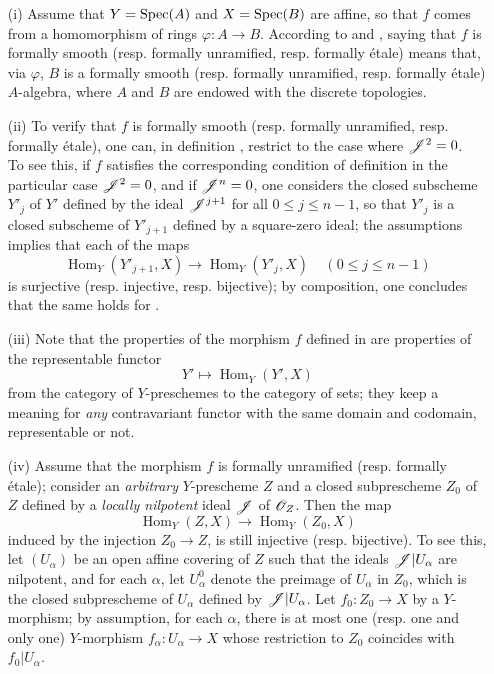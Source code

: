 \begin{remark}[17.1.2]
\label{IV.17.1.2}
\begin{enumerate}
	\item[(i)] Assume that $Y = {\mathop{\mathrm{Spec}}\nolimits}(A)$ and $X = {\mathop{\mathrm{Spec}}\nolimits}(B)$ are affine, so that $f$ comes from a homomorphism of rings $\varphi: A \to B$. 
    According to  and , saying that $f$ is formally smooth (resp. formally unramified, resp. formally \'etale) means that, via $\varphi$, $B$ is a formally smooth (resp. formally unramified, resp. formally \'etale) $A$-algebra, where $A$ and $B$ are endowed with the discrete topologies.
	\item[(ii)] To verify that $f$ is formally smooth (resp. formally unramified, resp. formally \'etale), one can, in definition , restrict to the case where $\mathscr{J}^2 = 0$.\\
To see this, if $f$ satisfies the corresponding condition of definition  in the particular case $\mathscr{J}^2 = 0$, and if $\mathscr{J}^n = 0$, one considers the closed subscheme $Y'_j$ of $Y'$ defined by the ideal $\mathscr{J}^{j+1}$ for all $0\leq j \leq n-1$, so that $Y'_j$ is a closed subscheme of $Y'_{j+1}$ defined by a square-zero ideal; the assumptions implies that each of the maps
\[
	\operatorname{Hom}_Y(Y'_{j+1}, X) \to \operatorname{Hom}_Y(Y'_j, X) \ \ \ \ \ (0 \leq j \leq n-1) 
\] is surjective (resp. injective, resp. bijective); by composition, one concludes that the same holds for .
\item[(iii)] Note that the properties of the morphism $f$ defined in  are properties of the representable functor 
\[
  Y' \mapsto \operatorname{Hom}_Y(Y', X) 
\] from the category of $Y$-preschemes to the category of sets; they keep a meaning for \emph{any} contravariant functor with the same domain and codomain, representable or not.
\item[(iv)] Assume that the morphism $f$ is formally unramified (resp. formally \'etale); consider an \emph{arbitrary} $Y$-prescheme $Z$ and a closed subprescheme $Z_0$ of $Z$ defined by a \emph{locally nilpotent} ideal $\mathscr{J}$ of $\mathscr{O}_Z$. 
Then the map
\[
\label{IV.17.1.2.1}	
		\operatorname{Hom}_Y(Z, X) \to \operatorname{Hom}_Y(Z_0, X)
\tag{17.1.2.1}
\] induced by the injection $Z_0 \to Z$, is still injective (resp. bijective).
To see this, let $(U_\alpha)$ be an open affine covering of $Z$ such that the ideals $\mathscr{J}|U_\alpha$ are nilpotent, and for each $\alpha$, let $U_\alpha ^0$ denote the preimage of $U_\alpha$ in $Z_0$, which is the closed subprescheme of $U_\alpha$ defined by $\mathscr{J}|U_\alpha$. Let $f_0: Z_0 \to X$ by a $Y$-morphism; by assumption, for each $\alpha$, there is at most one (resp. one and only one) $Y$-morphism $f_\alpha: U_\alpha \to X$ whose restriction to $Z_0$ coincides with $f_0|U_\alpha$. 

\end{enumerate}
\end{remark}
